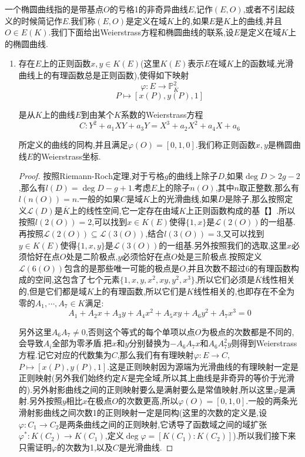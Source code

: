 一个椭圆曲线指的是带基点$O$的亏格1的非奇异曲线$E$,记作$(E,O)$,或者不引起歧义的时候简记作$E$.我们称$(E,O)$是定义在域$K$上的,如果$E$是$K$上的曲线,并且$O\in E(K)$.我们下面给出Weierstrass方程和椭圆曲线的联系,设$E$是定义在域$K$上的椭圆曲线.
\begin{enumerate}
	\item 存在$E$上的正则函数$x,y\in K(E)$(这里$K(E)$表示$E$在域$K$上的函数域,光滑曲线上的有理函数总是正则函数),使得如下映射
	$$\varphi:E\to\mathbb{P}^2_{\overline{K}}$$
	$$P\mapsto[x(P),y(P),1]$$
	
	是从$K$上的曲线$E$到由某个$K$系数的Weierstrass方程
	$$C:Y^2+a_1XY+a_3Y=X^3+a_2X^2+a_4X+a_6$$
	
	所定义的曲线的同构,并且满足$\varphi(O)=[0,1,0]$.我们称正则函数$x,y$是椭圆曲线$E$的Weierstrass坐标.
	\begin{proof}
		
		按照Riemann-Roch定理,对于亏格$g$的曲线上除子$D$,如果$\deg D>2g-2$,那么有$l(D)=\deg D-g+1$.考虑$E$上的除子$n(O)$,其中$n$取正整数,那么有$l(n(O))=n$.一般的如果$C$是域$K$上的光滑曲线,如果$D$是除子,那么按照定义$\mathscr{L}(D)$是$\overline{K}$上的线性空间,它一定存在由域$K$上正则函数构成的基【】.所以按照$l(2(O))=2$,可以找到$x\in K(E)$使得$\{1,x\}$是$\mathscr{L}(2(O))$的一组基.再按照$\mathscr{L}(2(O))\subseteq\mathscr{L}(3(O))$,结合$l(3(O))=3$,又可以找到$y\in K(E)$使得$\{1,x,y\}$是$\mathscr{L}(3(O))$的一组基.另外按照我们的选取,这里$x$必须恰好在点$O$处是二阶极点,$y$必须恰好在点$O$处是三阶极点.按照定义$\mathscr{L}(6(O))$包含的是那些唯一可能的极点是$O$,并且次数不超过6的有理函数构成的空间,这包含了七个元素$\{1,x,y,x^2,xy,y^2,x^3\}$,所以它们必须是$\overline{K}$线性相关的,但是它们都是域$K$上的有理函数,所以它们是$K$线性相关的,也即存在不全为零的$A_1,\cdots,A_7\in K$满足:
		$$A_1+A_2x+A_3y+A_4x^2+A_5xy+A_6y^2+A_7x^3=0$$
		
		另外这里$A_6A_7\not=0$,否则这个等式的每个单项以点$O$为极点的次数都是不同的,会导致$A_i$全部为零矛盾.把$x$和$y$分别替换为$-A_6A_7x$和$A_6A_7^2y$则得到Weierstrass方程.记它对应的代数集为$C$,那么我们有有理映射$\varphi:E\to C$,$P\mapsto[x(P),y(P),1]$.这是正则映射因为源端为光滑曲线的有理映射一定是正则映射(另外我们始终约定$K$是完全域,所以其上曲线是非奇异的等价于光滑的).另外射影曲线之间的正则映射要么是满射要么是常值映射,所以这里$\varphi$是满射.另外按照$y$相比$x$在极点$O$的次数更高,所以$\varphi(O)=[0,1,0]$.一般的两条光滑射影曲线之间次数1的正则映射一定是同构(这里的次数的定义是,设$\varphi:C_1\to C_2$是两条曲线之间的正则映射,它诱导了函数域之间的域扩张$\varphi^*:K(C_2)\to K(C_1)$,定义$\deg\varphi=[K(C_1):K(C_2)]$).所以我们接下来只需证明$\varphi$的次数为1,以及$C$是光滑曲线.
		

\end{proof}
\end{enumerate}

